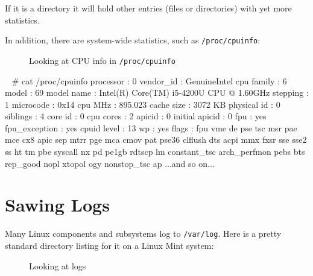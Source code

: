 \documentclass[10pt,american,]{book}
\newenvironment{Shaded}{\begin{snugshade}}{\end{snugshade}}
\newcommand{\KeywordTok}[1]{\textcolor[rgb]{0.13,0.29,0.53}{\textbf{{#1}}}}
\newcommand{\CommentTok}[1]{\textcolor[rgb]{0.56,0.35,0.01}{\textit{{#1}}}}
\newcommand{\NormalTok}[1]{{#1}}
\numberwithin{figure}{chapter}
\DeclareRobustCommand{\drcap}[1]{\begin{figure}[H]\caption{#1}\end{figure}}
\renewcommand{\KeywordTok}[1]{{#1}}
\renewcommand{\CommentTok}[1]{{#1}}
\renewcommand{\NormalTok}[1]{{#1}}
\begin{document}
If it is a directory it will hold other entries (files or directories)
with yet more statistics.

In addition, there are system-wide statistics, such as
\texttt{/proc/cpuinfo}:

\drcap{Looking at CPU info in \texttt{/proc/cpuinfo}}

\begin{Shaded}
\begin{Highlighting}[]
\KeywordTok{~} \CommentTok{# cat /proc/cpuinfo }
\KeywordTok{processor}   \NormalTok{: 0}
\KeywordTok{vendor_id}   \NormalTok{: GenuineIntel}
\KeywordTok{cpu} \NormalTok{family  : 6}
\KeywordTok{model}       \NormalTok{: 69}
\KeywordTok{model} \NormalTok{name  : Intel(R) }\KeywordTok{Core}\NormalTok{(TM) }\KeywordTok{i5-4200U} \NormalTok{CPU @ 1.60GHz}
\KeywordTok{stepping}    \NormalTok{: 1}
\KeywordTok{microcode}   \NormalTok{: 0x14}
\KeywordTok{cpu} \NormalTok{MHz     : 895.023}
\KeywordTok{cache} \NormalTok{size  : 3072 KB}
\KeywordTok{physical} \NormalTok{id : 0}
\KeywordTok{siblings}    \NormalTok{: 4}
\KeywordTok{core} \NormalTok{id     : 0}
\KeywordTok{cpu} \NormalTok{cores   : 2}
\KeywordTok{apicid}      \NormalTok{: 0}
\KeywordTok{initial} \NormalTok{apicid  : 0}
\KeywordTok{fpu}     \NormalTok{: yes}
\KeywordTok{fpu_exception}   \NormalTok{: yes}
\KeywordTok{cpuid} \NormalTok{level : 13}
\KeywordTok{wp}      \NormalTok{: yes}
\KeywordTok{flags}       \NormalTok{: fpu vme de pse tsc msr pae mce cx8 apic sep mtrr pge mca cmov }
\KeywordTok{pat} \NormalTok{pse36 clflush dts acpi mmx fxsr sse sse2 ss ht tm pbe syscall nx pd}
\KeywordTok{pe1gb} \NormalTok{rdtscp lm constant_tsc arch_perfmon pebs bts rep_good nopl xtopol}
\KeywordTok{ogy} \NormalTok{nonstop_tsc ap}
\KeywordTok{...and} \NormalTok{so on...}
\end{Highlighting}
\end{Shaded}

\section*{Sawing Logs}\label{sawing-logs}

Many Linux components and subsystems log to \texttt{/var/log}. Here is a
pretty standard directory listing for it on a Linux Mint system:

\drcap{Looking at logs}
\end{document}
